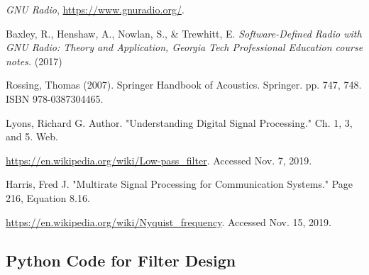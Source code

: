 %
%
%
\begin{thebibliography}{1}

\emph{GNU Radio}, \url{https://www.gnuradio.org/}.

Baxley, R., Henshaw, A., Nowlan, S., \& Trewhitt, E. \emph{Software-Defined Radio with GNU Radio: Theory and Application, Georgia Tech Professional Education course notes.} (2017)

Rossing, Thomas (2007). Springer Handbook of Acoustics. Springer. pp. 747, 748. ISBN 978-0387304465.

Lyons, Richard G. Author. "Understanding Digital Signal Processing."  Ch. 1, 3, and 5. Web.

\url{https://en.wikipedia.org/wiki/Low-pass_filter}.  Accessed Nov. 7, 2019.

Harris, Fred J. "Multirate Signal Processing for Communication Systems." Page 216, Equation 8.16.

\url{https://en.wikipedia.org/wiki/Nyquist_frequency}.  Accessed Nov. 15, 2019.

\end{thebibliography}


\newpage


\onecolumn
\appendix 

\subsection{Python Code for Filter Design\cite{notes:class}}

